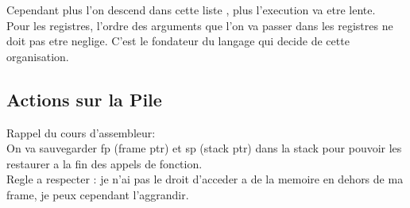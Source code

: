 \documentclass[a4paper,11pt]{article}
\begin{document}
Cependant plus l'on descend dans cette liste , plus l'execution va etre lente.\\

Pour les registres, l'ordre des arguments que l'on va passer dans les registres ne doit pas etre neglige. C'est le fondateur du langage qui decide de cette organisation.\\

\subsection{Actions sur la Pile}
Rappel du cours d'assembleur:\\
On va sauvegarder fp (frame ptr) et sp (stack ptr) dans la stack pour pouvoir les restaurer a la fin des appels de fonction.\\
Regle a respecter : je n'ai pas le droit d'acceder a de la memoire en dehors de ma frame, je peux cependant l'aggrandir.\\
\end{document}

